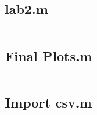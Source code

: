 \documentclass[notitlepage, a4paper, 11pt]{article}
\begin{document}
	\subsection*{lab2.m}
	\inputminted{matlab}{../Matlab/lab2.m}
	\subsection*{Final Plots.m}
	\inputminted{matlab}{../Matlab/Final_Plots.m}
	\subsection*{Import csv.m}
	\inputminted{matlab}{../Matlab/RC_circuit.m}
\end{document}
